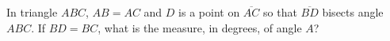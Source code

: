 In triangle $ABC$, $AB=AC$ and $D$ is a point on $\overline{AC}$ so that $\overline{BD}$ bisects angle $ABC$. If $BD=BC$, what is the measure, in degrees, of angle $A$?
